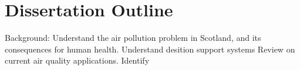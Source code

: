 \section{Dissertation Outline}
Background:
Understand the air pollution problem in Scotland, and its consequences for human health.
Understand desition support systems
Review on current air quality applications.
Identify 